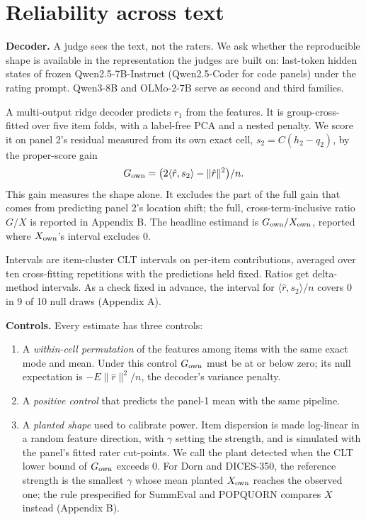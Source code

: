 \documentclass{article}
\providecommand{\tightlist}{\setlength{\itemsep}{0pt}\setlength{\parskip}{0pt}}
\begin{document}
\section{Reliability across text}


\textbf{Decoder.} A judge sees the text, not the raters. We ask whether the reproducible shape is available in the representation the judges are built on: last-token hidden states of frozen Qwen2.5-7B-Instruct (Qwen2.5-Coder for code panels) under the rating prompt. Qwen3-8B and OLMo-2-7B serve as second and third families.

A multi-output ridge decoder predicts \(r_1\) from the features. It is group-cross-fitted over five item folds, with a label-free PCA and a nested penalty. We score it on panel 2's residual measured from its own exact cell, \(s_2 = C(h_2-q_2)\), by the proper-score gain \[G_{\rm own} = \big(2\langle\hat r,s_2\rangle-\|\hat r\|^2\big)/n .\] This gain measures the shape alone. It excludes the part of the full gain that comes from predicting panel 2's location shift; the full, cross-term-inclusive ratio \(G/X\) is reported in Appendix B. The headline estimand is \(G_{\rm own}/X_{\rm own}\), reported where \(X_{\rm own}\)'s interval excludes 0.

Intervals are item-cluster CLT intervals on per-item contributions, averaged over ten cross-fitting repetitions with the predictions held fixed. Ratios get delta-method intervals. As a check fixed in advance, the interval for \(\langle\hat r,s_2\rangle/n\) covers 0 in 9 of 10 null draws (Appendix A).

\textbf{Controls.} Every estimate has three controls:

\begin{enumerate}
\def\labelenumi{\arabic{enumi}.}
\tightlist
\item
  A \emph{within-cell permutation} of the features among items with the same exact mode and mean. Under this control \(G_{\rm own}\) must be at or below zero; its null expectation is \(-E\|\hat r\|^2/n\), the decoder's variance penalty.
\item
  A \emph{positive control} that predicts the panel-1 mean with the same pipeline.
\item
  A \emph{planted shape} used to calibrate power. Item dispersion is made log-linear in a random feature direction, with $\gamma$ setting the strength, and is simulated with the panel's fitted rater cut-points. We call the plant detected when the CLT lower bound of \(G_{\rm own}\) exceeds 0. For Dorn and DICES-350, the reference strength is the smallest $\gamma$ whose mean planted \(X_{\rm own}\) reaches the observed one; the rule prespecified for SummEval and POPQUORN compares \(X\) instead (Appendix B).
\end{enumerate}
\end{document}

